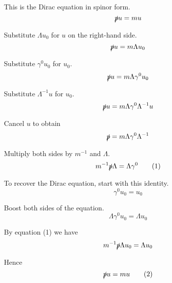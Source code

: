 This is the Dirac equation in spinor form.
\begin{equation*}
\slashed pu=mu
\end{equation*}

Substitute $\Lambda u_0$ for $u$ on the right-hand side.
\begin{equation*}
\slashed pu=m\Lambda u_0
\end{equation*}

Substitute $\gamma^0u_0$ for $u_0$.
\begin{equation*}
\slashed pu=m\Lambda\gamma^0u_0
\end{equation*}

Substitute $\Lambda^{-1}u$ for $u_0$.
\begin{equation*}
\slashed pu=m\Lambda\gamma^0\Lambda^{-1}u
\end{equation*}

Cancel $u$ to obtain
\begin{equation*}
\slashed p=m\Lambda\gamma^0\Lambda^{-1}
\end{equation*}

Multiply both sides by $m^{-1}$ and $\Lambda$.
\begin{equation*}
m^{-1}\slashed p\Lambda=\Lambda\gamma^0
\tag{1}
\end{equation*}

To recover the Dirac equation, start with this identity.
\begin{equation*}
\gamma^0u_0=u_0
\end{equation*}

Boost both sides of the equation.
\begin{equation*}
\Lambda\gamma^0u_0=\Lambda u_0
\end{equation*}

By equation (1) we have
\begin{equation*}
m^{-1}\slashed p\Lambda u_0=\Lambda u_0
\end{equation*}

Hence
\begin{equation*}
\slashed pu=mu
\tag{2}
\end{equation*}


